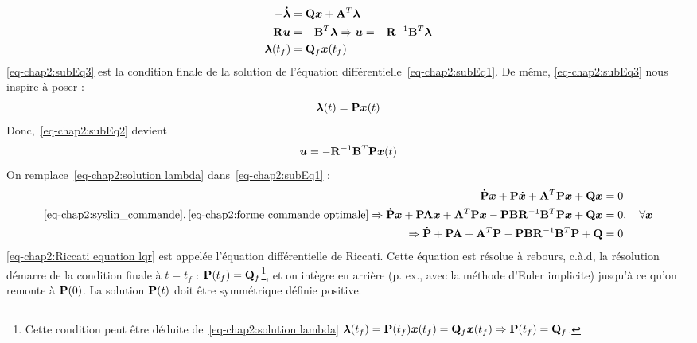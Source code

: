  \begin{align}
 \label{eq-chap2:subEq1}-\boldsymbol{\dot{\lambda}}&=	\mathbf{Q}\bm{x} + \mathbf{A}^T\boldsymbol{\lambda} \\\label{eq-chap2:subEq2}
 \mathbf{R}\bm{u} &= -\mathbf{B}^T\boldsymbol{\lambda} \Rightarrow \bm{u} = -\mathbf{R}^{-1}\mathbf{B}^T\boldsymbol{\lambda}\\\label{eq-chap2:subEq3}
 \boldsymbol{\lambda}(t_f) &= \mathbf{Q}_f\bm{x}(t_f)
 \end{align}
 \cref{eq-chap2:subEq3} est la condition finale de la solution de l'équation différentielle~\eqref{eq-chap2:subEq1}. De même,  \cref{eq-chap2:subEq3} nous inspire à poser : 
 \begin{equation}\label{eq-chap2:solution lambda}
 	\boldsymbol{\lambda}(t) = \mathbf{P}\bm{x}(t)
 \end{equation}
Donc,~\cref{eq-chap2:subEq2} devient 
\begin{equation}\label{eq-chap2:forme commande optimale}
	\bm{u} = -\mathbf{R}^{-1}\mathbf{B}^T\mathbf{P}\bm{x}(t)
\end{equation}
On remplace~\eqref{eq-chap2:solution lambda} dans~\eqref{eq-chap2:subEq1} : 
\begin{align}\label{eq-chap2:Riccati equation lqr}
	\begin{split}
		\boldsymbol{\dot{\mathbf{P}}}\bm{x} + \mathbf{P}\bm{\dot{x}} + \mathbf{A}^T\mathbf{P}\bm{x} + \mathbf{Q}\bm{x}&=0\\
		\eqref{eq-chap2:syslin_commande},\eqref{eq-chap2:forme commande optimale}\Rightarrow\boldsymbol{\dot{\mathbf{P}}}\bm{x} + \mathbf{P}\mathbf{A}\bm{x} +\mathbf{A}^T\mathbf{P}\bm{x} -\mathbf{P}\mathbf{B}\mathbf{R}^{-1}\mathbf{B}^T\mathbf{P}\bm{x}+ \mathbf{Q}\bm{x}&=0, \quad \forall\bm{x}\\
		\Rightarrow\boldsymbol{\dot{\mathbf{P}}} + \mathbf{P}\mathbf{A}+ \mathbf{A}^T\mathbf{P} -\mathbf{P}\mathbf{B}\mathbf{R}^{-1}\mathbf{B}^T\mathbf{P}+ \mathbf{Q}&=0
	\end{split}
\end{align}
\cref{eq-chap2:Riccati equation lqr} est appelée l'équation différentielle de Riccati. Cette équation est résolue à rebours, c.à.d, la résolution démarre de la condition finale à $t=t_f$ : $\mathbf{P}(t_f)=\mathbf{Q}_f$\footnote{Cette condition peut être déduite de~\eqref{eq-chap2:solution lambda} $ \boldsymbol{\lambda}(t_f) = \mathbf{P}(t_f)\bm{x}(t_f)= \mathbf{Q}_f\bm{x}(t_f)\Rightarrow\mathbf{P}(t_f)=\mathbf{Q}_f$.}, et on intègre en arrière (p. ex., avec la méthode d'Euler implicite)  jusqu'à ce qu'on remonte à $\mathbf{P}(0)$. La solution $\mathbf{P}(t)$ doit être symmétrique définie positive.
